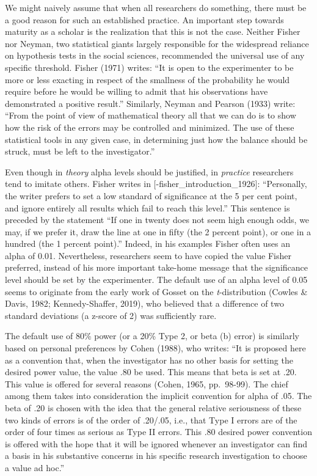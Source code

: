 \documentclass[
  english,
  ,man, a4paper,floatsintext]{apa6}
\begin{document}
We might naively assume that when all researchers do something, there must be a good reason for such an established practice. An important step towards maturity as a scholar is the realization that this is not the case. Neither Fisher nor Neyman, two statistical giants largely responsible for the widespread reliance on hypothesis tests in the social sciences, recommended the universal use of any specific threshold. Fisher (1971) writes: ``It is open to the experimenter to be more or less exacting in respect of the smallness of the probability he would require before he would be willing to admit that his observations have demonstrated a positive result.'' Similarly, Neyman and Pearson (1933) write: ``From the point of view of mathematical theory all that we can do is to show how the risk of the errors may be controlled and minimized. The use of these statistical tools in any given case, in determining just how the balance should be struck, must be left to the investigator.''

Even though in \emph{theory} alpha levels should be justified, in \emph{practice} researchers tend to imitate others. Fisher writes in {[}-fisher\_introduction\_1926{]}: ``Personally, the writer prefers to set a low standard of significance at the 5 per cent point, and ignore entirely all results which fail to reach this level.'' This sentence is preceded by the statement ``If one in twenty does not seem high enough odds, we may, if we prefer it, draw the line at one in fifty (the 2 percent point), or one in a hundred (the 1 percent point).'' Indeed, in his examples Fisher often uses an alpha of 0.01. Nevertheless, researchers seem to have copied the value Fisher preferred, instead of his more important take-home message that the significance level should be set by the experimenter. The default use of an alpha level of 0.05 seems to originate from the early work of Gosset on the \emph{t}-distribution (Cowles \& Davis, 1982; Kennedy-Shaffer, 2019), who believed that a difference of two standard deviations (a z-score of 2) was sufficiently rare.

The default use of 80\% power (or a 20\% Type 2, or beta (b) error) is similarly based on personal preferences by Cohen (1988), who writes: ``It is proposed here as a convention that, when the investigator has no other basis for setting the desired power value, the value .80 be used. This means that beta is set at .20. This value is offered for several reasons (Cohen, 1965, pp.~98-99). The chief among them takes into consideration the implicit convention for alpha of .05. The beta of .20 is chosen with the idea that the general relative seriousness of these two kinds of errors is of the order of .20/.05, i.e., that Type I errors are of the order of four times as serious as Type II errors. This .80 desired power convention is offered with the hope that it will be ignored whenever an investigator can find a basis in his substantive concerns in his specific research investigation to choose a value ad hoc.''
\end{document}
